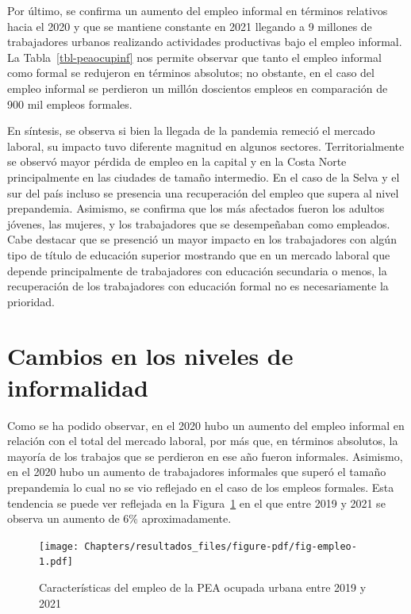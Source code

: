 \documentclass[
  letterpaper,
  12pt,
  oneside,
  spanish,
  doublespacing,
  headsepline,
  parskip]{MastersDoctoralThesis}
\begin{document}
Por último, se confirma un aumento del empleo informal en términos
relativos hacia el 2020 y que se mantiene constante en 2021 llegando a 9
millones de trabajadores urbanos realizando actividades productivas bajo
el empleo informal. La Tabla~\ref{tbl-peaocupinf} nos permite observar
que tanto el empleo informal como formal se redujeron en términos
absolutos; no obstante, en el caso del empleo informal se perdieron un
millón doscientos empleos en comparación de 900 mil empleos formales.

En síntesis, se observa si bien la llegada de la pandemia remeció el
mercado laboral, su impacto tuvo diferente magnitud en algunos sectores.
Territorialmente se observó mayor pérdida de empleo en la capital y en
la Costa Norte principalmente en las ciudades de tamaño intermedio. En
el caso de la Selva y el sur del país incluso se presencia una
recuperación del empleo que supera al nivel prepandemia. Asimismo, se
confirma que los más afectados fueron los adultos jóvenes, las mujeres,
y los trabajadores que se desempeñaban como empleados. Cabe destacar que
se presenció un mayor impacto en los trabajadores con algún tipo de
título de educación superior mostrando que en un mercado laboral que
depende principalmente de trabajadores con educación secundaria o menos,
la recuperación de los trabajadores con educación formal no es
necesariamente la prioridad.

\hypertarget{cambios-en-los-niveles-de-informalidad}{%
\section{Cambios en los niveles de
informalidad}\label{cambios-en-los-niveles-de-informalidad}}

Como se ha podido observar, en el 2020 hubo un aumento del empleo
informal en relación con el total del mercado laboral, por más que, en
términos absolutos, la mayoría de los trabajos que se perdieron en ese
año fueron informales. Asimismo, en el 2020 hubo un aumento de
trabajadores informales que superó el tamaño prepandemia lo cual no se
vio reflejado en el caso de los empleos formales. Esta tendencia se
puede ver reflejada en la Figura~\ref{fig-empleo} en el que entre 2019 y
2021 se observa un aumento de 6\% aproximadamente.

\break

\begin{figure}

\caption{\label{fig-empleo}Características del empleo de la PEA ocupada
urbana entre 2019 y 2021}

{\centering \texttt{[image: Chapters/resultados\_files/figure-pdf/fig-empleo-1.pdf]}

}

\end{figure}
\end{document}
